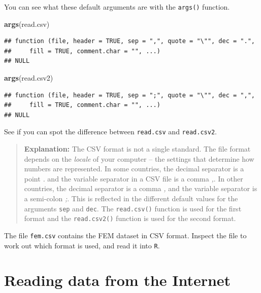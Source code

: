 \documentclass[
]{book}
\newenvironment{Shaded}{\begin{snugshade}}{\end{snugshade}}
\newcommand{\FunctionTok}[1]{\textcolor[rgb]{0.13,0.29,0.53}{\textbf{#1}}}
\newcommand{\NormalTok}[1]{#1}
\theoremstyle{definition}
\theoremstyle{definition}
\theoremstyle{definition}
\theoremstyle{definition}
\theoremstyle{remark}
\begin{document}
You can see what these default arguments are with the \texttt{args()}
function.

\begin{Shaded}
\begin{Highlighting}[]
\FunctionTok{args}\NormalTok{(read.csv)}
\end{Highlighting}
\end{Shaded}

\begin{verbatim}
## function (file, header = TRUE, sep = ",", quote = "\"", dec = ".", 
##     fill = TRUE, comment.char = "", ...) 
## NULL
\end{verbatim}

\begin{Shaded}
\begin{Highlighting}[]
\FunctionTok{args}\NormalTok{(read.csv2)}
\end{Highlighting}
\end{Shaded}

\begin{verbatim}
## function (file, header = TRUE, sep = ";", quote = "\"", dec = ",", 
##     fill = TRUE, comment.char = "", ...) 
## NULL
\end{verbatim}

See if you can spot the difference between \texttt{read.csv} and
\texttt{read.csv2}.

\begin{quote}
\textbf{Explanation:} The CSV format is not a single standard. The
file format depends on the \emph{locale} of your computer -- the
settings that determine how numbers are represented. In some
countries, the decimal separator is a point \emph{.} and the variable
separator in a CSV file is a comma \emph{,}. In other countries, the
decimal separator is a comma \emph{,} and the variable separator is a
semi-colon \emph{;}. This is reflected in the different default values
for the arguments \texttt{sep} and \texttt{dec}. The
\texttt{read.csv()} function is used for the first format and the
\texttt{read.csv2()} function is used for the second format.
\end{quote}

The file \texttt{fem.csv} contains the FEM dataset in CSV format.
Inspect the file to work out which format is used, and read it into
\texttt{R}.

\section{Reading data from the Internet}\label{reading-data-from-the-internet}
\end{document}
